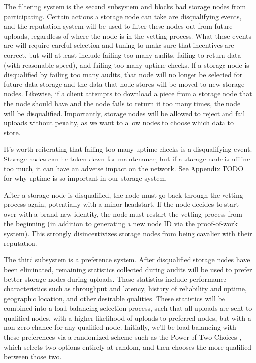 \documentclass[a4paper,10pt]{article} \usepackage[utf8]{inputenc}
\newcommand{\todo}[1]{{\color{red} TODO #1 }}
\begin{document}
The filtering system is the second subsystem and blocks bad storage nodes from
participating.
Certain actions a storage node can take are disqualifying events, and the
reputation system will be used to filter these nodes out from future uploads,
regardless of where the node is in the vetting process.
What these events are will require careful selection and tuning to make sure
that incentives are correct, but will at least include failing too many audits,
failing to return data (with reasonable speed), and failing too many uptime
checks.
If a storage node is disqualified by failing too many audits, that node will no
longer be selected for future data storage and the data that node stores will
be moved to new storage nodes.
Likewise, if a client attempts to download a piece from a storage node that
the node should have and the node fails to return it too many times, the
node will be disqualified. Importantly, storage nodes will be allowed to reject
and fail uploads without penalty, as we want to allow nodes to choose which data
to store.

It's worth reiterating that failing too many uptime checks is a disqualifying
event. Storage nodes can be taken down for maintenance, but if a storage node
is offline too much, it can have an adverse impact on the network. See Appendix
\todo{} for why uptime is so important in our storage system.

After a storage node is disqualified, the node must go back through the vetting
process again, potentially with a minor headstart. If the node decides to start
over with a brand new identity, the node must restart the vetting process from
the beginning (in addition to generating a new node ID via the proof-of-work
system). This strongly disincentivizes storage nodes from being cavalier with
their reputation.

The third subsystem is a preference system. After disqualified storage nodes
have been eliminated, remaining statistics collected during audits
will be used to prefer better storage nodes during uploads.
These statistics include performance characteristics such as throughput and
latency, history of reliability and uptime, geographic location, and other
desirable qualities.
These statistics will be combined into a load-balancing selection process, such
that all uploads are sent to qualified nodes, with a higher likelihood of
uploads to preferred nodes, but with a non-zero chance for any qualified node.
Initially, we'll be load balancing with these preferences via a randomized
scheme such as the Power of Two Choices \cite{power-of-two-choices}, which
selects two options entirely at random, and then chooses the more qualified
between those two.
\end{document}
